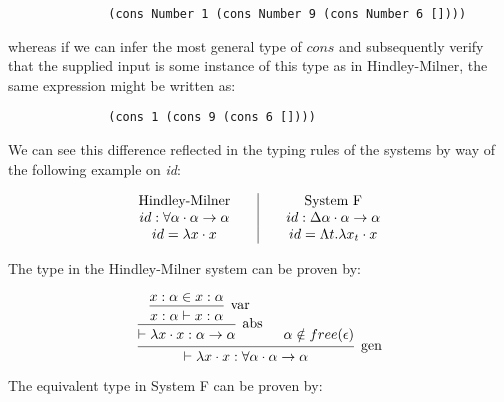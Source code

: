 \documentclass{ProgressReport}[2020/09/15]
\begin{document}
            \begin{verbatim}
              (cons Number 1 (cons Number 9 (cons Number 6 [])))  
            \end{verbatim}
            
            whereas if we can infer the most general type of $cons$ and
            subsequently verify that the supplied input is some instance of this
            type as in Hindley-Milner, the same expression might be written as:
            
            \begin{verbatim}
              (cons 1 (cons 9 (cons 6 [])))  
            \end{verbatim}
            
            We can see this difference reflected in the typing rules of the
            systems by way of the following example on \emph{id}:
            
            \[\begin{array}{c@{\qquad}|@{\qquad}c}
                  \mbox{Hindley-Milner}
                  &
                  \mbox{System F}
                  \\
                  id : \forall \alpha \cdot \alpha \to \alpha
                  &
                  id : \Delta \alpha \cdot \alpha \to \alpha
                  \\                  id = \lambda x \cdot x
                  &
                  id = \Lambda t . \lambda x_t \cdot x
            \end{array} \]
            
            The type in the Hindley-Milner system can be proven by:
            
            
            \[\begin{array}{c}
            \mbox{\begin{prooftree}
                    \hypo{x : \alpha \in x : \alpha}   
                  \infer1[var]{x : \alpha \vdash x : \alpha}
                \infer1[abs]{\vdash \lambda x \cdot x : \alpha \to \alpha}
                \hypo{\alpha \notin free(\epsilon)}
               \infer2[gen]{\vdash \lambda x \cdot x : \forall \alpha \cdot
               \alpha \to \alpha}
            \end{prooftree}}
            \end{array} \]
            
            
            The equivalent type in System F can be proven by:
            
\end{document}
